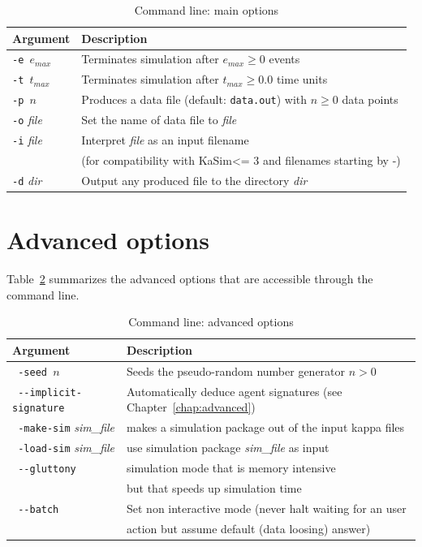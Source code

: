 \documentclass[11pt]{book}
\def\KaSim{\textsf{KaSim}}
\def\ttt#1{\texttt{#1}}
\def\mit#1{{\mathit #1}}
\def\dd{-\hspace{0.001cm}-}
\begin{document}
\begin{table}[h!]
\caption{Command line: main options}
\centering
\begin{tabular}{|l|l|}
\hline 
Argument & Description \\ \hline
\ttt{-e $e_{\mit{max}}$} & Terminates simulation after $e_{\mit{max}}\geq 0$ events\\
\ttt{-t $t_{\mit{max}}$} & Terminates simulation after $t_{\mit{max}}\geq 0.0$ time units\\
\ttt{-p $n$} & Produces a data file\index{data file} (default: \ttt{data.out}) with $n\geq 0$ data points\\
\ttt{-o} \textit{file} & Set the name of data file to \textit{file}\\
\ttt{-i} \textit{file} & Interpret \textit{file} as an input filename\\
& (for compatibility with \KaSim <= 3 and filenames starting by -)\\
\ttt{-d} \textit{dir} & Output any produced file to the directory \textit{dir}\\
\hline
\end{tabular}
\label{tab:options}
\end{table}%

\section{Advanced options}

Table~\ref{tab:add-options} summarizes the advanced options that are accessible through the command line.

\begin{table}[h!]
\caption{Command line: advanced options}
\centering
\begin{tabular}{|l|l|}
\hline 
Argument & Description \\ \hline
\ttt{ -seed $n$} & Seeds the pseudo-random number generator $n>0$ \\
\ttt{ \dd implicit-signature} & Automatically deduce agent signature\index{agent signature}s (see Chapter~\ref{chap:advanced})\\
\ttt{ -make-sim} \textit{sim\_file} & makes a simulation package out of the input kappa files \\
\ttt{ -load-sim} \textit{sim\_file} & use simulation package \textit{sim\_file} as input\\
\ttt{ \dd gluttony} & simulation mode that is memory intensive \\ & but that speeds up simulation time\\
\ttt{ \dd batch} & Set non interactive mode (never halt waiting for an user\\
& action but assume default (data loosing) answer)\\
\hline
\end{tabular}
\label{tab:add-options}
\end{table}%
%
\end{document}
